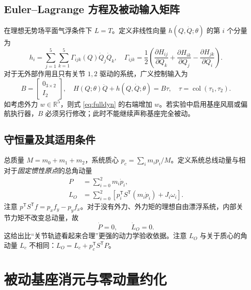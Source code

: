 \documentclass[journal,onecolumn]{IEEEtran}
\newcommand{\R}{\mathbb R}
\newcommand{\tr}{\mathsf T}
\newcommand{\col}{\operatorname{col}}
\begin{document}
\subsection{Euler--Lagrange 方程及被动输入矩阵}
在理想无势场平面气浮条件下 $L=T$。定义非线性向量 $h(Q,\dot Q;\theta)$ 的第 $i$ 个分量为
\begin{equation}
 h_i=\sum_{j=1}^5\sum_{k=1}^5 \Gamma_{ijk}(Q)\dot Q_j\dot Q_k,\quad
 \Gamma_{ijk}=\frac12\left(\frac{\partial H_{ij}}{\partial Q_k}+\frac{\partial H_{ik}}{\partial Q_j}-\frac{\partial H_{jk}}{\partial Q_i}\right).
 \label{eq:christoffel}
\end{equation}
对于无外部作用且只有关节 $1,2$ 驱动的系统，广义控制输入为
\begin{equation}
 B=\begin{bmatrix}0_{3\times2}\\I_2\end{bmatrix},\quad
 H(Q;\theta)\ddot Q+h(Q,\dot Q;\theta)=B\tau,\quad\tau=\col(\tau_1,\tau_2).
 \label{eq:fulldyn}
\end{equation}
如考虑外力 $w\in\R^5$，则式 \eqref{eq:fulldyn} 的右端增加 $w$。若实验中启用基座风扇或偏航执行器，$B$ 必须另行修改；此时不能继续声称基座完全被动。

\subsection{守恒量及其适用条件}
总质量 $M=m_0+m_1+m_2$，系统质心 $p_c=\sum_i m_ip_i/M$。定义系统总线动量与相对于\emph{固定惯性原点}的总角动量
\begin{align}
 P&=\sum_{i=0}^2m_i\dot p_i,\label{eq:P}\\
 L_O&=\sum_{i=0}^2\left[p_i^\tr S^\tr(m_i\dot p_i)+J_i\omega_i\right].\label{eq:LO}
\end{align}
注意 $p^\tr S^\tr f=p_xf_y-p_yf_x$。对于没有外力、外力矩的理想自由漂浮系统，内部关节力矩不改变总动量，故
\begin{equation}
 \boxed{\dot P=0,\qquad\dot L_O=0.}
 \label{eq:conservation}
\end{equation}
这给出比“关节轨迹看起来合理”更强的动力学验收依据。注意 $L_O$ 与关于质心的角动量 $L_c$ 不相同：$L_O=L_c+p_c^\tr S^\tr P$。

\section{被动基座消元与零动量约化}
\end{document}
